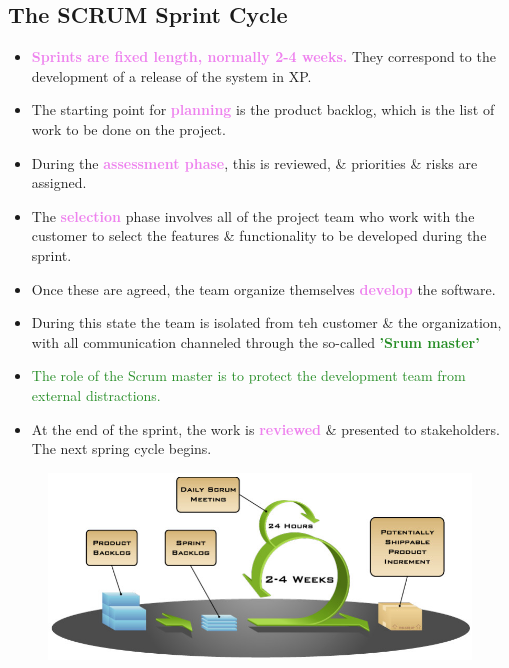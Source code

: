 \documentclass{report}
\newcommand{\textg}[1]{\textcolor{ForestGreen}{#1}}
\newcommand{\textv}[1]{\textcolor{violet}{#1}}
\newcommand{\textbfg}[1]{\textbf{\textg{#1}}}
\newcommand{\textbfv}[1]{\textbf{\textv{#1}}}
\begin{document}
\subsection{The SCRUM Sprint Cycle}
\begin{itemize}
  \item \textbfv{Sprints are fixed length, normally 2-4 weeks.} They correspond to the development of a release of the system in XP.
  \item The starting point for \textbfv{planning} is the product backlog, which is the list of work to be done on the project.
  \item During the \textbfv{assessment phase}, this is reviewed, \& priorities \& risks are assigned.
  \item The \textbfv{selection} phase involves all of the project team who work with the customer to select the features \& functionality to be developed during the sprint.
  \item Once these are agreed, the team organize themselves \textbfv{develop} the software.
  \item During this state the team is isolated from teh customer \& the organization, with all communication channeled through the so-called \textbfg{'Srum master'}
  \item \textg{The role of the Scrum master is to protect the development team from external distractions.}
  \item At the end of the sprint, the work is \textbfv{reviewed} \& presented to stakeholders. The next spring cycle begins.
\end{itemize}
\begin{figure}[H]
\centering
\includegraphics[scale=.5,trim=1cm 1cm 1cm 1cm]{assets/CEN4010_Scrum_Overview.jpg}
\end{figure}
\end{document}
